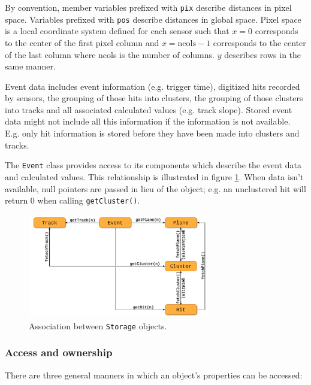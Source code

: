 \documentclass[10pt,a4paper]{book}
\begin{document}
By convention, member variables prefixed with \Verb`pix` describe distances in pixel space. Variables prefixed with \Verb`pos` describe distances in global space. Pixel space is a local coordinate system defined for each sensor such that $x = 0$ corresponds to the center of the first pixel column and $x = \mathrm{ncols} - 1$ corresponds to the center of the last column where ncols is the number of columns. $y$ describes rows in the same manner.

Event data includes event information (e.g. trigger time), digitized hits recorded by sensors, the grouping of those hits into clusters, the grouping of those clusters into tracks and all associated calculated values (e.g. track slope). Stored event data might not include all this information if the information is not available. E.g. only hit information is stored before they have been made into clusters and tracks.

The \Verb`Event` class provides access to its components which describe the event data and calculated values. This relationship is illustrated in figure \ref{fig:modules_storage_objects}. When data isn't available, null pointers are passed in lieu of the object; e.g. an unclustered hit will return 0 when calling \Verb`getCluster()`.

\begin{figure}[htb]
  \centering
  \includegraphics[width=0.7\textwidth]{images/modules_storage_objects.pdf}
  \caption{Association between \protect\Verb`Storage` objects.}
  \label{fig:modules_storage_objects}
\end{figure}

\subsubsection*{Access and ownership}

There are three general manners in which an object's properties can be accessed:
\end{document}
